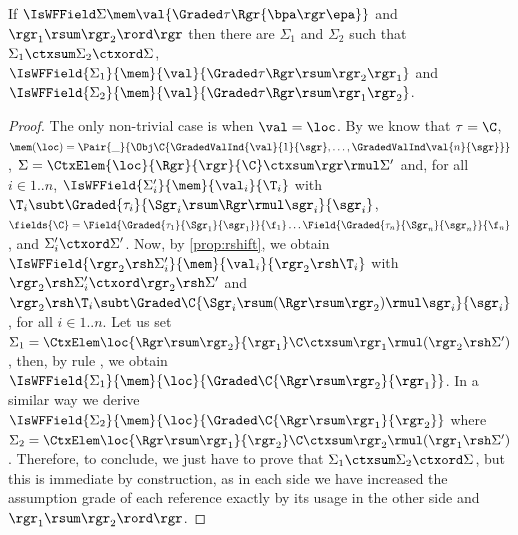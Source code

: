 \begin{proposition}\label{prop:split-ty} 
If $\IsWFField\Sigma\mem\val{\Graded\tau\Rgr{\bpa\rgr\epa}}$  \bpa and  $\rgr_1\rsum\rgr_2\rord\rgr$ \epa then 
there are $\Sigma_1$ and $\Sigma_2$ such that 
$\Sigma_1\ctxsum\Sigma_2\ctxord\Sigma$, 
$\IsWFField{\Sigma_1}{\mem}{\val}{\Graded\tau{\Rgr\rsum\rgr_2}{\rgr_1}}$ and 
$\IsWFField{\Sigma_2}{\mem}{\val}{\Graded\tau{\Rgr\rsum\rgr_1}{\rgr_2}}$. 
\end{proposition} 
\begin{proof}
The only non-trivial case is when $\val = \loc$. 
By  we know that 
$\tau = \C$, 
$\mem(\loc) = \Pair{\_}
{\Obj\C{\GradedValInd{\val}{1}{\sgr},\ldots,\GradedValInd\val{n}{\sgr}}} $, 
$\Sigma = \CtxElem{\loc}{\Rgr}{\rgr}{\C}\ctxsum \rgr\rmul\Sigma'$ and, for all $i \in 1..n$, 
$\IsWFField{\Sigma'_i}{\mem}{\val_i}{\T_i}$ with 
$\T_i\subt\Graded{\tau_i}{\Sgr_i\rsum \Rgr\rmul\sgr_i}{\sgr_i}$, 
$\fields{\C} = \Field{\Graded{\tau_1}{\Sgr_1}{\sgr_1}}{\f_1} \ldots \Field{\Graded{\tau_n}{\Sgr_n}{\sgr_n}}{\f_n}$, 
and $\Sigma'_i \ctxord \Sigma'$. 
Now, by \cref{prop:rshift}, we obtain 
$\IsWFField{\rgr_2\rsh\Sigma'_i}{\mem}{\val_i}{\rgr_2\rsh\T_i}$ with 
$\rgr_2\rsh\Sigma'_i \ctxord \rgr_2\rsh\Sigma'$ and 
$\rgr_2\rsh\T_i \subt \Graded\C{\Sgr_i\rsum(\Rgr\rsum\rgr_2)\rmul\sgr_i}{\sgr_i}$, 
for all $i\in 1..n$. 
Let us set 
$\Sigma_1 = \CtxElem\loc{\Rgr\rsum\rgr_2}{\rgr_1}\C \ctxsum \rgr_1\rmul (\rgr_2\rsh\Sigma')$, then, by rule , we obtain 
$\IsWFField{\Sigma_1}{\mem}{\loc}{\Graded\C{\Rgr\rsum\rgr_2}{\rgr_1}}$. 
In a similar way we derive $\IsWFField{\Sigma_2}{\mem}{\loc}{\Graded\C{\Rgr\rsum\rgr_1}{\rgr_2}}$ where $\Sigma_2  = \CtxElem\loc{\Rgr\rsum\rgr_1}{\rgr_2}\C \ctxsum \rgr_2\rmul(\rgr_1\rsh\Sigma')$. 
Therefore, to conclude, we just have to prove that $\Sigma_1\ctxsum\Sigma_2 \ctxord \Sigma$, but this is immediate by construction, as in each side we have increased the assumption grade of each reference exactly by its usage in the other side \bpa and  $\rgr_1\rsum\rgr_2\rord\rgr$. \epa

\end{proof}


